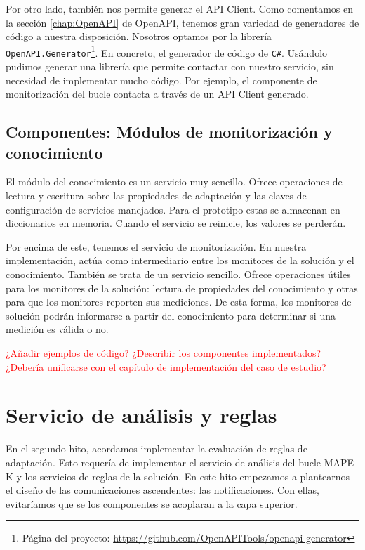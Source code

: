 Por otro lado, también nos permite generar el API Client. Como comentamos en la sección \ref{chap:OpenAPI} de OpenAPI, tenemos gran variedad de generadores de código a nuestra disposición. Nosotros optamos por la librería \texttt{OpenAPI.Generator}\footnote{Página del proyecto: \url{https://github.com/OpenAPITools/openapi-generator}}. En concreto, el generador de código de \verb|C#|. Usándolo pudimos generar una librería que permite contactar con nuestro servicio, sin necesidad de implementar mucho código. Por ejemplo, el componente de monitorización del bucle contacta a través de un API Client generado.

\subsection{Componentes: Módulos de monitorización y conocimiento}

El módulo del conocimiento es un servicio muy sencillo. Ofrece operaciones de lectura y escritura sobre las propiedades de adaptación y las claves de configuración de servicios manejados. Para el prototipo estas se almacenan en diccionarios en memoria. Cuando el servicio se reinicie, los valores se perderán.

Por encima de este, tenemos el servicio de monitorización. En nuestra implementación, actúa como intermediario entre los monitores de la solución y el conocimiento. También se trata de un servicio sencillo. Ofrece operaciones útiles para los monitores de la solución: lectura de propiedades del conocimiento y otras para que los monitores reporten sus mediciones. De esta forma, los monitores de solución podrán informarse a partir del conocimiento para determinar si una medición es válida o no.

\textcolor{red}{¿Añadir ejemplos de código? ¿Describir los componentes implementados? ¿Debería unificarse con el capítulo de implementación del caso de estudio?}

\section{Servicio de análisis y reglas}
\label{sec:implementacion-modulo-reglas}

En el segundo hito, acordamos implementar la evaluación de reglas de adaptación. Esto requería de implementar el servicio de análisis del bucle MAPE-K y los servicios de reglas de la solución. En este hito empezamos a plantearnos el diseño de las comunicaciones ascendentes: las notificaciones. Con ellas, evitaríamos que se los componentes se acoplaran a la capa superior.

